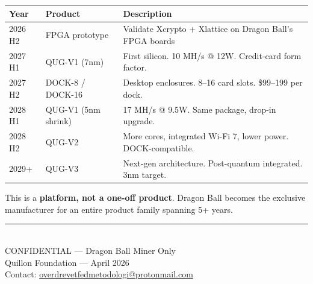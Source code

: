 \documentclass[11pt,a4paper]{article}
\begin{document}
\begin{center}
\begin{tabular}{@{}llp{8cm}@{}}
\toprule
\textbf{Year} & \textbf{Product} & \textbf{Description} \\
\midrule
2026 H2 & FPGA prototype & Validate Xcrypto + Xlattice on Dragon Ball's FPGA boards \\
2027 H1 & QUG-V1 (7nm) & First silicon. 10 MH/s @ 12W. Credit-card form factor. \\
2027 H2 & DOCK-8 / DOCK-16 & Desktop enclosures. 8--16 card slots. \$99--199 per dock. \\
2028 H1 & QUG-V1 (5nm shrink) & 17 MH/s @ 9.5W. Same package, drop-in upgrade. \\
2028 H2 & QUG-V2 & More cores, integrated Wi-Fi 7, lower power. DOCK-compatible. \\
2029+ & QUG-V3 & Next-gen architecture. Post-quantum integrated. 3nm target. \\
\bottomrule
\end{tabular}
\end{center}

This is a \textbf{platform, not a one-off product}. Dragon Ball becomes the exclusive manufacturer for an entire product family spanning 5+ years.

\vspace{1.5em}

\begin{center}
\textcolor{qnkpurple}{\rule{0.5\textwidth}{1.5pt}}\\[8pt]
{\small\textcolor{qnkslate}{CONFIDENTIAL --- Dragon Ball Miner Only}}\\[4pt]
{\small\textcolor{qnkslate}{Quillon Foundation --- April 2026}}\\[4pt]
{\small\textcolor{qnkslate}{Contact: \href{mailto:overdrevetfedmetodologi@protonmail.com}{overdrevetfedmetodologi@protonmail.com}}}
\end{center}
\end{document}
